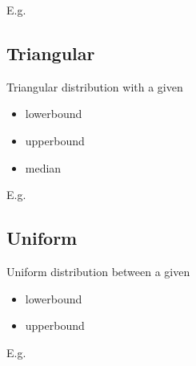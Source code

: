 \documentclass[letterpaper,10pt,english]{sphinxmanual}
\begin{document}
E.g.

\begin{sphinxVerbatim}[commandchars=\\\{\}]
    
\end{sphinxVerbatim}


\subsection{Triangular}
\label{\detokenize{Distributions:triangular}}
Triangular distribution with a given
\begin{itemize}
\item {} 
lowerbound

\item {} 
upperbound

\item {} 
median

\end{itemize}

E.g.

\begin{sphinxVerbatim}[commandchars=\\\{\}]
    
\end{sphinxVerbatim}


\subsection{Uniform}
\label{\detokenize{Distributions:uniform}}
Uniform distribution between a given
\begin{itemize}
\item {} 
lowerbound

\item {} 
upperbound

\end{itemize}

E.g.

\begin{sphinxVerbatim}[commandchars=\\\{\}]
   
\end{sphinxVerbatim}
\end{document}
